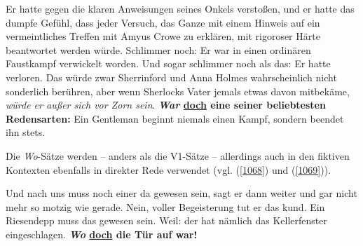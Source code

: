 {\begin{exe}
	\ex\label{1067} 
	\scriptsize
	Er hatte gegen die klaren Anweisungen seines Onkels verstoßen, und er hatte das dumpfe Gefühl, dass jeder Versuch, das Ganze mit einem Hinweis auf ein 		vermeintliches Treffen mit Amyus Crowe zu erklären, mit rigoroser Härte beantwortet werden würde. Schlimmer noch: Er war in einen ordinären Faustkampf 		verwickelt worden. Und sogar schlimmer noch als das: Er hatte verloren. Das würde zwar Sherrinford und Anna Holmes wahrscheinlich nicht sonderlich 			berühren, aber wenn Sherlocks Vater jemals etwas davon mitbekäme, \emph{würde er außer sich vor Zorn sein}. \textbf{\textit{War} \underline{doch} eine 		seiner beliebtesten Redensarten:} Ein Gentleman beginnt niemals einen Kampf, sondern beendet ihn stets. 	
	\hfill\hbox {\citet[220-221]{Lane2014}}
\end{exe}
Die \textit{Wo}-Sätze werden – anders als die V1-Sätze – allerdings auch in den fiktiven Kontexten ebenfalls in direkter Rede verwendet (vgl. (\ref{1068}) und (\ref{1069})).

\begin{exe}
	\ex\label{1068} 
	\scriptsize
	\glqq Und nach uns muss noch einer da gewesen sein\grqq{}, sagt er dann weiter und gar nicht mehr so motzig wie gerade. Nein, voller Begeisterung tut 		er das kund. \glqq Ein Riesendepp muss das gewesen sein. Weil: der hat nämlich das Kellerfenster eingeschlagen. \textbf{\textit{Wo} \underline{doch} 		die Tür auf war!}\grqq{} 	
	\hfill\hbox {\citet[68]{Falk2010}}
\end{exe}

}

